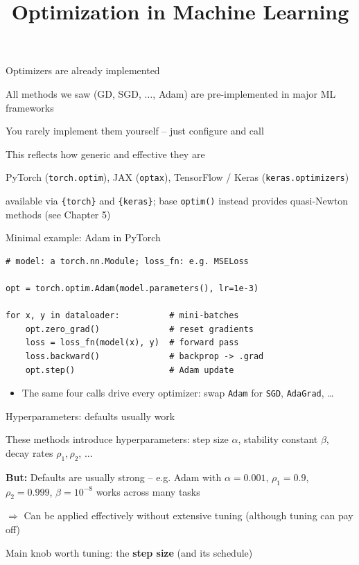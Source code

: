 \documentclass[11pt,compress,t,notes=noshow, xcolor=table]{beamer}
\title{Optimization in Machine Learning}
\begin{document}

\begin{framei}{Optimizers are already implemented}
\item All methods we saw (GD, SGD, $\dots$, Adam) are pre-implemented in major ML frameworks
\item You rarely implement them yourself -- just configure and call
\item This reflects how generic and effective they are
\spacer
\item[Python] PyTorch (\texttt{torch.optim}), JAX (\texttt{optax}), TensorFlow / Keras (\texttt{keras.optimizers})
\item[R] available via \texttt{\{torch\}} and \texttt{\{keras\}}; base \texttt{optim()} instead provides quasi-Newton methods (see Chapter 5)
\end{framei}


\begin{frame}[fragile]{Minimal example: Adam in PyTorch}

\begin{verbatim}
# model: a torch.nn.Module; loss_fn: e.g. MSELoss

opt = torch.optim.Adam(model.parameters(), lr=1e-3)

for x, y in dataloader:          # mini-batches
    opt.zero_grad()              # reset gradients
    loss = loss_fn(model(x), y)  # forward pass
    loss.backward()              # backprop -> .grad
    opt.step()                   # Adam update
\end{verbatim}

\begin{itemize}
\item The same four calls drive every optimizer: swap \texttt{Adam} for \texttt{SGD}, \texttt{AdaGrad}, \ldots
\end{itemize}
\end{frame}


\begin{framei}{Hyperparameters: defaults usually work}
\item These methods introduce hyperparameters: step size $\alpha$, stability constant $\beta$, decay rates $\rho_1, \rho_2$, $\dots$
\item \textbf{But:} Defaults are usually strong -- e.g. Adam with $\alpha = 0.001$, $\rho_1 = 0.9$, $\rho_2 = 0.999$, $\beta = 10^{-8}$ works across many tasks
\item $\Rightarrow$ Can be applied effectively without extensive tuning (although tuning can pay off)
\spacer
\item Main knob worth tuning: the \textbf{step size} (and its schedule)
\end{framei}

\endlecture
\end{document}
